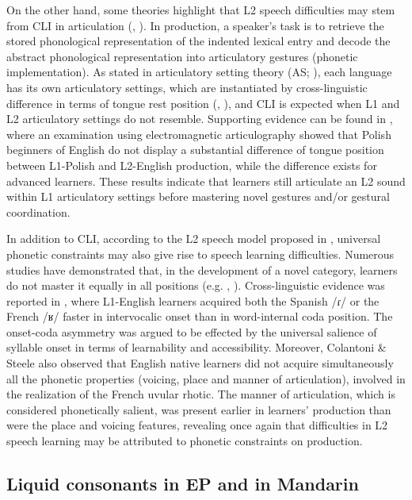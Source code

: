 \documentclass[output=paper]{../langscibook}
\begin{document}
On the other hand, some theories highlight that L2 speech difficulties may stem from CLI in articulation (\citealt{Honikman1964}, \citealt{ZimmerAlves2012}). In production, a speaker’s task is to retrieve the stored phonological representation of the indented lexical entry and decode the abstract phonological representation into articulatory gestures (phonetic implementation). As stated in articulatory setting theory (AS; \citealt{Honikman1964}), each language has its own articulatory settings, which are instantiated by cross-linguistic difference in terms of tongue rest position (\citealt{GickEtAl2004}, \citealt{WilsonGick2014}), and CLI is expected when L1 and L2 articulatory settings do not resemble. Supporting evidence can be found in \citet{Swiecinski2013}, where an examination using electromagnetic articulography showed that Polish beginners of English do not display a substantial difference of tongue position between L1-Polish and L2-English production, while the difference exists for advanced learners. These results indicate that learners still articulate an L2 sound within L1 articulatory settings before mastering novel gestures and/or gestural coordination.

In addition to CLI, according to the L2 speech model proposed in \citet{ColantoniSteele2008}, universal phonetic constraints may also give rise to speech learning difficulties. Numerous studies have demonstrated that, in the development of a novel category, learners do not master it equally in all positions (e.g. \citealt{ColantoniSteele2008}, \citealt{Waltmunson2005}). Cross-linguistic evidence was reported in \citet{ColantoniSteele2008}, where L1-English learners acquired both the Spanish /ɾ/ or the French /ʁ/ faster in intervocalic onset than in word-internal coda position. The onset-coda asymmetry was argued to be effected by the universal salience of syllable onset in terms of learnability and accessibility. Moreover, Colantoni \& Steele also observed that English native learners did not acquire simultaneously all the phonetic properties (voicing, place and manner of articulation), involved in the realization of the French uvular rhotic. The manner of articulation, which is considered phonetically salient, was present earlier in learners’ production than were the place and voicing features, revealing once again that difficulties in L2 speech learning may be attributed to phonetic constraints on production.



\subsection{Liquid consonants in EP and in Mandarin}
\label{sec:zhou:3}
\end{document}
